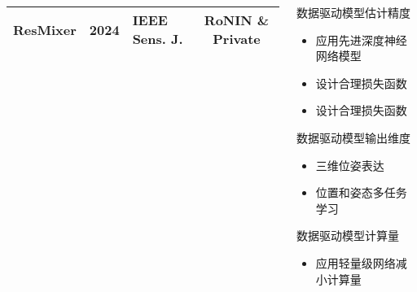 \begin{frame}
\begin{columns}[t]
\begin{column}{0.5\textwidth}
{\begin{tabular*}{\textwidth}{@{\extracolsep{\fill}}lclc}
				              ResMixer & 2024 & IEEE Sens. J.                   & RoNIN \& Private       \\
				\bottomrule
			\end{tabular*}     
		}
		\end{column}
		\begin{column}{0.5\textwidth}
		    \vspace{-1.0cm}
			\begin{block}{数据驱动模型估计精度}
			    {
			        \footnotesize
					\begin{itemize}
						\item 应用先进深度神经网络模型
						\item 设计合理损失函数
						\item 设计合理损失函数
					\end{itemize}			    
			    }
			\end{block}
		    \begin{block}{数据驱动模型输出维度}
  			    {
  			        \footnotesize
					\begin{itemize}
						\item 三维位姿表达
						\item 位置和姿态多任务学习
					\end{itemize}
				}
			\end{block}
			\begin{block}{数据驱动模型计算量}
			    {
			        \footnotesize
					\begin{itemize}
						\item 应用轻量级网络减小计算量
					\end{itemize}
				}
			\end{block}
		\end{column}
	\end{columns}	
\end{frame}

